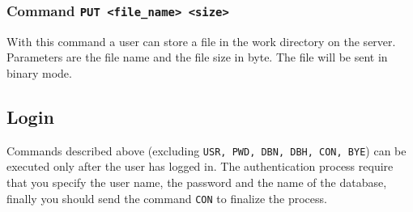 \documentclass[12pt,titlepage]{book}
\begin{document}
\subsubsection{Command \tt{PUT <file\_name> <size>}}
With this command a user can store a file in the work directory on the server.
Parameters are the file name and the file size in byte. The file will be sent
in binary mode.



\subsection{Login}\label{sec:login}
Commands described above (excluding \verb|USR, PWD, DBN, DBH, CON, BYE|) can
be executed only after the user has logged in. The authentication process
require that you specify the user name, the password and the name of the
database, finally you should send the command \verb|CON| to finalize the
process.


%
%
\end{document}
